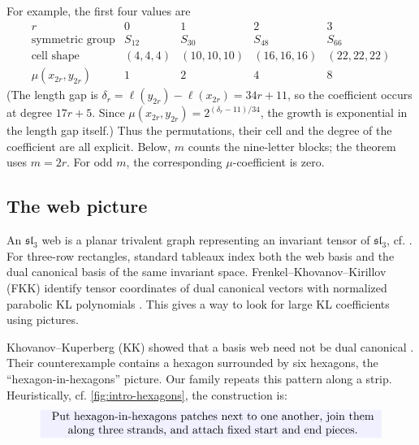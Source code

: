\documentclass[a4paper,11pt]{amsart}
\let\emph\relax
\numberwithin{equation}{subsection}
\theoremstyle{plain}
\theoremstyle{definition}
\theoremstyle{remark}
\begin{document}
For example, the first four values are
\[
\begin{array}{c|cccc}
r&0&1&2&3\\\hline
\text{symmetric group}&S_{12}&S_{30}&S_{48}&S_{66}\\
\text{cell shape}&(4,4,4)&(10,10,10)&(16,16,16)&(22,22,22)\\
\mu(x_{2r},y_{2r})&1&2&4&8
\end{array}
\]
(The length gap is
$\delta_r=\ell(y_{2r})-\ell(x_{2r})=34r+11$, so the coefficient
occurs at degree $17r+5$. Since
$\mu(x_{2r},y_{2r})=2^{(\delta_r-11)/34}$, the growth is
exponential in the length gap itself.) Thus the permutations, their cell and the degree of the
coefficient are all explicit.
Below, $m$ counts the nine-letter blocks; the theorem uses $m=2r$.
For odd $m$, the corresponding $\mu$-coefficient is zero.

\subsection{The web picture}

An $\mathfrak{sl}_3$ web is a planar trivalent graph representing an
invariant tensor of $\mathfrak{sl}_3$, cf. \cite{Kuperberg}. For three-row rectangles, standard tableaux index
both the web basis and the dual canonical basis of the same invariant
space. Frenkel--Khovanov--Kirillov (FKK) identify tensor coordinates of dual
canonical vectors with normalized parabolic KL polynomials \cite{FKK}.
This gives a way to look for large KL coefficients using pictures.

Khovanov--Kuperberg (KK) showed that a basis web need not be dual canonical
\cite{KK}. Their counterexample contains a hexagon surrounded by six
hexagons, the ``hexagon-in-hexagons'' picture. Our family repeats this
pattern along a strip. Heuristically, cf. \autoref{fig:intro-hexagons}, the construction is:
\[
\setlength{\fboxsep}{2pt}
\colorbox{blue!6}{
\begin{minipage}{0.85\textwidth}
\centering
\emph{Put hexagon-in-hexagons patches next to one another,
join them along three strands, and attach fixed start and end pieces.}
\end{minipage}}
\]
\end{document}
